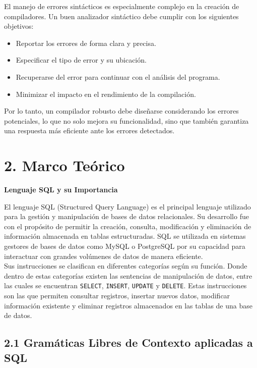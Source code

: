\documentclass{article}
\begin{document}
El manejo de errores sintácticos es especialmente complejo en la creación de compiladores. Un buen 
analizador sintáctico debe cumplir con los siguientes objetivos: 
\begin{itemize}
\item Reportar los errores de forma clara y precisa. 
\item Especificar el tipo de error y su ubicación. 
\item Recuperarse del error para continuar con el análisis del programa. 
\item Minimizar el impacto en el rendimiento de la compilación. 
\end{itemize}
Por lo tanto, un compilador robusto debe diseñarse considerando los errores potenciales, lo que no solo mejora 
su funcionalidad, sino que también garantiza una respuesta más eficiente ante los errores detectados. 



\newpage

\section{2. Marco Teórico}

\textbf{Lenguaje SQL y su Importancia}

El lenguaje SQL (Structured Query Language) es el principal lenguaje utilizado para la gestión y manipulación de bases de datos relacionales. Su desarrollo fue con el propósito de permitir la creación, consulta, modificación y eliminación de información almacenada en tablas estructuradas. SQL se utilizada en sistemas gestores de bases de datos como MySQL o PostgreSQL por su capacidad para interactuar con grandes volúmenes de datos de manera eficiente. \\

Sus instrucciones se clasifican en diferentes categorías según su función. Donde dentro de estas categorías existen las sentencias de manipulación de datos, entre las cuales se encuentran \texttt{SELECT}, \texttt{INSERT}, \texttt{UPDATE} y \texttt{DELETE}. Estas instrucciones son las que permiten consultar registros, insertar nuevos datos, modificar información existente y eliminar registros almacenados en las tablas de una base de datos. \\

\subsection{2.1 Gramáticas Libres de Contexto aplicadas a SQL}
\end{document}
